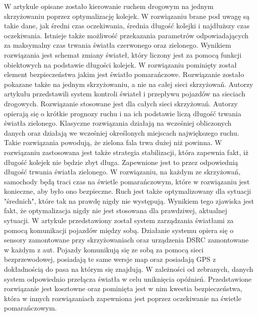 \newline
\indent
W artykule \cite{de1998optimal} opisane zostało kierowanie ruchem drogowym na jednym skrzyżowaniu poprzez optymalizację kolejek. W rozwiązaniu brane pod uwagę są takie dane, jak średni czas oczekiwania, średnia długość kolejki i najdłuższy czas oczekiwania. Istnieje także możliwość przekazania parametrów odpowiadających za maksymalny czas trwania światła czerwonego oraz zielonego. Wynikiem rozwiązania jest schemat zmiany świateł, który liczony jest za pomocą funkcji obiektowych na podstawie długości kolejek. W rozwiązaniu pominięty został element bezpieczeństwa jakim jest światło pomarańczowe. Rozwiązanie zostało pokazane także na jednym skrzyżowaniu, a nie na całej sieci skrzyżowań.
\newline
\indent
  Autorzy artykułu \cite{lammer2008self} przedstawili system kontroli świateł i przepływu pojazdów na sieciach drogowych. Rozwiązanie stosowane jest dla całych sieci skrzyżowań. Autorzy opierają się o krótkie prognozy ruchu i na ich podstawie liczą długość trwania światła zielonego. Klasyczne rozwiązania działają na wcześniej obliczonych danych oraz działają we wcześniej określonych miejscach największego ruchu. Takie rozwiązania powodują, że zielona fala trwa dużej niż powinna. W rozwiązaniu zastosowana jest także strategia stabilizacji, która zapewnia fakt, iż długość kolejek nie będzie zbyt długa. Zapewnione jest to przez odpowiednią długość trwania światła zielonego. W rozwiązaniu, na każdym ze skrzyżowań, samochody będą traci czas na świetle pomarańczowym, które w rozwiązaniu jest konieczne, aby było ono bezpieczne. Ruch jest także optymalizowany dla sytuacji "średnich", które tak na prawdę nigdy nie występują. Wynikiem tego zjawiska jest fakt, że optymalizacja nigdy nie jest stosowana dla prawdziwej, aktualnej sytuacji.
\newline
\indent
W artykule \cite{ferreira2010self} przedstawiony został system zarządzania światłami za pomocą komunikacji pojazdów między sobą. Działanie systemu opiera się o sensory zamontowane przy skrzyżowaniach oraz urządzenia DSRC zamontowane w każdym z aut. Pojazdy komunikują się ze sobą za pomocą sieci bezprzewodowej, posiadają te same wersje map oraz posiadają GPS z dokładnością do pasa na którym się znajdują. W zależności od zebranych, danych system odpowiednio przełącza światła w celu uniknięcia opóźnień. Przedstawione rozwiązanie jest kosztowne oraz pominięta jest w nim kwestia bezpieczeństwa, która w innych rozwiązaniach zapewniona jest poprzez oczekiwanie na świetle pomarańczowym.
    
